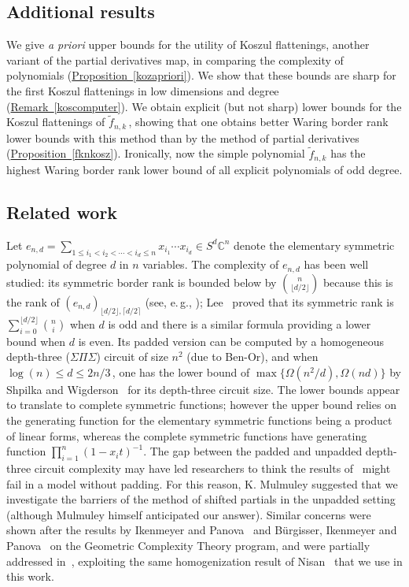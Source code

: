 \documentclass[11pt]{article}
\numberwithin{equation}{section}
\theoremstyle{definition}
\theoremstyle{plain}
\newcommand{\eg}{e.\,g.}
\newcommand{\expref}[2]{\hyperref[#2]{#1~\ref{#2}}}
\renewcommand{\tilde}[1]{\widetilde{#1}}
\def\BC{\mathbb C}
\begin{document}
 
 
 \subsection*{Additional results} We give \emph{a priori} upper bounds for the utility of Koszul flattenings, another variant of the partial derivatives map, in comparing the complexity of polynomials (\expref{Proposition}{kozapriori}). We show that these bounds are sharp for the first Koszul flattenings in low dimensions and degree (\expref{Remark}{koscomputer}). We  obtain explicit (but not sharp) lower bounds for the Koszul flattenings of $\tilde f_{n,k}$\,, showing that one obtains better Waring border rank lower bounds with this method than by the method of partial derivatives (\expref{Proposition}{fknkosz}). Ironically, now the simple polynomial $\tilde f_{n,k}$ has the highest Waring  border rank lower bound of all explicit polynomials of odd degree.
 
 
 \subsection*{Related work} Let $e_{n,d}=\sum_{1\leq i_1<i_2< \cdots <i_d\leq n} x_{i_1}\cdots x_{i_d}\in S^d\BC^n$ denote the elementary symmetric polynomial of degree $d$ in $n$ variables. The complexity of $e_{n,d}$ has been well studied: its symmetric border rank is bounded below by $\binom{n}{\lfloor {d}/{2}\rfloor}$ because this is the rank of $(e_{n,d})_{ \lfloor d/2 \rfloor, \lceil d/2 \rceil}$ (see, \eg, \cite{NisWig:LowerBoundsArithCircPartDer}); 
 Lee~\cite{MR3440150} proved that its symmetric rank is $\sum_{i=0}^{\lfloor d/2\rfloor}\binom{n}{i}$ when $d$ is odd and there is a similar formula providing a lower bound when $d$ is even. Its padded version can be computed  by a homogeneous depth-three ($\Sigma\Pi\Sigma$)  circuit of size $n^2$ (due to Ben-Or), and when $\log(n)\leq d\leq {2n}/3$\,,  one has the lower bound of $\max\{ \Omega ({n^2}/{d}),\Omega(n d)\}$ %
 by Shpilka and Wigderson~\cite{MR1867306} for its depth-three circuit size. The lower bounds  appear to translate to complete symmetric functions; however the upper bound relies on the generating function for the elementary symmetric functions being a product of linear forms, whereas the complete symmetric functions have generating function $\prod_{i=1}^n (1-x_it)^{-1}$. The gap between the padded and unpadded depth-three circuit complexity may have led researchers to
 think the results of~\cite{2016arXiv160902103E} might fail in a model without padding. For this reason, K. Mulmuley suggested that we investigate the barriers of the method of shifted partials in the unpadded setting (although Mulmuley himself anticipated our answer). Similar concerns were shown after the results %
 by Ikenmeyer and Panova~\cite{IkPa:Rectangular_Kron_in_GCT} and B\"urgisser, Ikenmeyer and Panova~\cite{BuIkPa:no_occurrence_obstructions_in_GCT} on the Geometric Complexity Theory program, and were partially addressed in~\cite{GesIkPa:GCT_and_matrix_pow}, exploiting the same homogenization result of %
 Nisan~\cite{Nisan:1991:LBN:103418.103462} that we use in this work.
 
\end{document}
